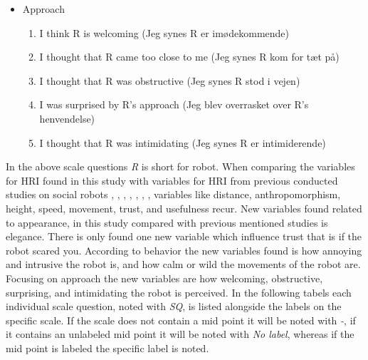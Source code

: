 \begin{itemize}
\begin{enumerate}
\end{enumerate}
\item Approach 
\begin{enumerate}
  \item I think R is welcoming (Jeg synes R er imødekommende)
  \item I thought that R came too close to me (Jeg synes R kom for tæt på)
  \item I thought that R was obstructive (Jeg synes R stod i vejen)
  \item I was surprised by R's approach (Jeg blev overrasket over R's henvendelse)
  \item I thought that R was intimidating (Jeg synes R er intimiderende)\\
\end{enumerate}
\end{itemize}
%
In the above scale questions \textit{R} is short for robot. When comparing the variables for HRI found in this study with variables for HRI from previous conducted studies on social robots \cite{PDF:ExploringInfluencingVariable}, \cite{PDF:SharingALifeHarvey}, \cite{PDF:InTheCompanyofRobots}, \cite{PDF:CloseButNotStuck}, \cite{PDF:TheImpactOfTraveler}, \cite{PDF:HumanRobotEmodiedInteraction}, \cite{PDF:RecommendationEffects}, variables like distance, anthropomorphism, height, speed, movement, trust, and usefulness recur. New variables found related to appearance, in this study compared with previous mentioned studies is elegance. There is only found one new variable which influence trust that is if the robot scared you. According to behavior the new variables found is how annoying and intrusive the robot is, and how calm or wild the movements of the robot are. Focusing on approach the new variables are how welcoming, obstructive, surprising, and intimidating the robot is perceived. In the following tabels each individual scale question, noted with \textit{SQ}, is listed alongside the labels on the specific scale. If the scale does not contain a mid point it will be noted with \textit{-}, if it contains an unlabeled mid point it will be noted with \textit{No label}, whereas if the mid point is labeled the specific label is noted. 
%
